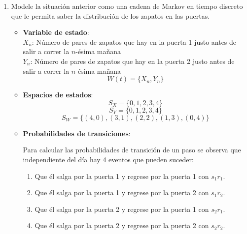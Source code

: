 \begin{enumerate}
    \item Modele la situación anterior como una cadena de Markov en tiempo discreto que le permita saber la distribución de los zapatos en las puertas. 

    \begin{itemize}
    	\item[] \textbf{Variable de estado}:\\
    	$X_n$: Número de pares de zapatos que hay en la puerta 1 justo antes de salir a correr la $n$-ésima mañana\\
            $Y_n$: Número de pares de zapatos que hay en la puerta 2 justo antes de salir a correr la $n$-ésima mañana\\
            \[ W(t) = \{ X_n, Y_n \} \]
    		
    	\item[] \textbf{Espacios de estados}:\\
            \[S_X=\{0,1,2,3,4\}\]
            \[S_Y=\{0,1,2,3,4\}\]
            \[S_W=\{(4,0),(3,1), (2,2), (1,3),(0,4)\}\]

    	\item[] \textbf{Probabilidades de transiciones}:\
            
            Para calcular las probabilidades de transición de un paso se observa que independiente del día hay 4 eventos que pueden suceder:
            \begin{enumerate}
                \item Que él salga por la puerta 1 y regrese por la puerta 1 con $s_1r_1$.
                \item Que él salga por la puerta 1 y regrese por la puerta 2 con $s_1r_2$.
                \item Que él salga por la puerta 2 y regrese por la puerta 1 con  $s_2r_1$.
                \item Que él salga por la puerta 2 y regrese por la puerta 2 con $s_2r_2$.
            \end{enumerate}


\end{itemize}
\end{enumerate}
